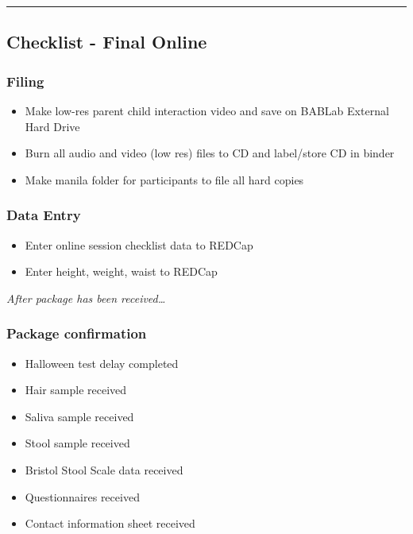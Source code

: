 \documentclass[]{book}
\providecommand{\tightlist}{%
  \setlength{\itemsep}{0pt}\setlength{\parskip}{0pt}}
\begin{document}
\begin{center}\rule{0.5\linewidth}{0.5pt}\end{center}

\hypertarget{checklist---final-online}{%
\subsection{Checklist - Final Online}\label{checklist---final-online}}

\hypertarget{filing-1}{%
\subsubsection{Filing}\label{filing-1}}

\begin{itemize}
\tightlist
\item
  Make low-res parent child interaction video and save on BABLab External Hard Drive
\item
  Burn all audio and video (low res) files to CD and label/store CD in binder
\item
  Make manila folder for participants to file all hard copies
\end{itemize}

\hypertarget{data-entry}{%
\subsubsection{Data Entry}\label{data-entry}}

\begin{itemize}
\tightlist
\item
  Enter online session checklist data to REDCap
\item
  Enter height, weight, waist to REDCap
\end{itemize}

\emph{After package has been received\ldots{}}

\hypertarget{package-confirmation}{%
\subsubsection{Package confirmation}\label{package-confirmation}}

\begin{itemize}
\tightlist
\item
  Halloween test delay completed
\item
  Hair sample received
\item
  Saliva sample received
\item
  Stool sample received
\item
  Bristol Stool Scale data received
\item
  Questionnaires received
\item
  Contact information sheet received
\end{itemize}
\end{document}
